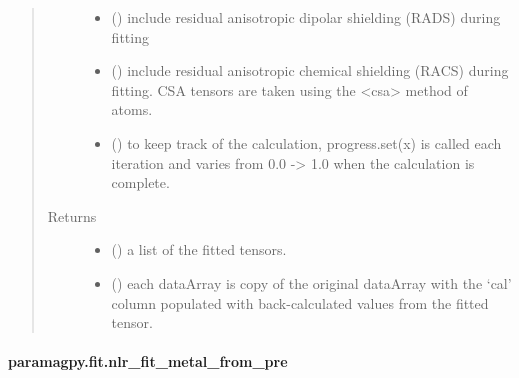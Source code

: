 \documentclass[a4paper,10pt,english,openany,oneside]{sphinxmanual}
\begin{document}
\begin{fulllineitems}
\begin{quote}
\begin{description}
\begin{itemize}
\item {} 
 (\sphinxstyleliteralemphasis{\sphinxupquote{, }}) \textendash{} include residual anisotropic dipolar shielding (RADS) during fitting

\item {} 
 (\sphinxstyleliteralemphasis{\sphinxupquote{, }}) \textendash{} include residual anisotropic chemical shielding (RACS) during fitting.
CSA tensors are taken using the \textless{}csa\textgreater{} method of atoms.

\item {} 
 (\sphinxstyleliteralemphasis{\sphinxupquote{, }}) \textendash{} to keep track of the calculation, progress.set(x) is called each
iteration and varies from 0.0 -\textgreater{} 1.0 when the calculation is complete.

\end{itemize}

\item[{Returns}] \leavevmode
\begin{itemize}
\item {} 
 () \textendash{} a list of the fitted tensors.

\item {} 
 () \textendash{} each dataArray is copy of the original dataArray with
the ‘cal’ column populated with back-calculated values from the
fitted tensor.

\end{itemize}


\end{description}\end{quote}

\end{fulllineitems}



\paragraph{paramagpy.fit.nlr\_fit\_metal\_from\_pre}
\label{\detokenize{reference/generated/paramagpy.fit.nlr_fit_metal_from_pre:paramagpy-fit-nlr-fit-metal-from-pre}}\label{\detokenize{reference/generated/paramagpy.fit.nlr_fit_metal_from_pre::doc}}
\end{document}
